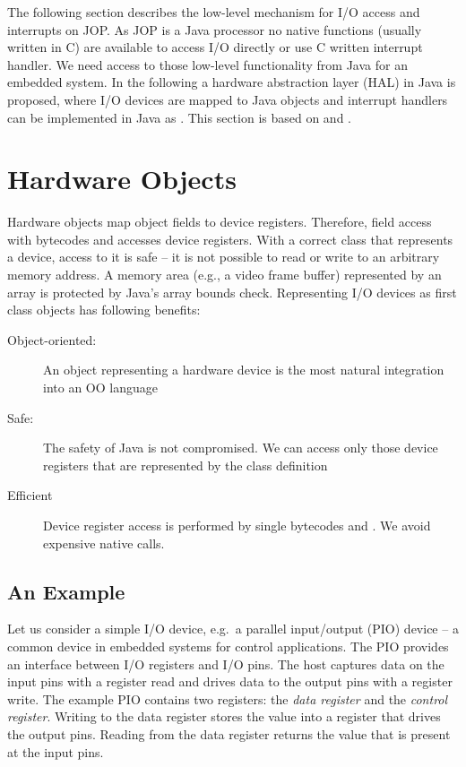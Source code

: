 
The following section describes the low-level mechanism for I/O
access and interrupts on JOP. As JOP is a Java processor no native
functions (usually written in C) are available to access I/O directly
or use C written interrupt handler. We need access to those low-level
functionality from Java for an embedded system. In the following a
hardware abstraction layer (HAL) in Java is proposed, where I/O
devices are mapped to Java objects and interrupt handlers can be
implemented in Java as . This section is based on
\cite{jop:hwobj} and \cite{jop:interrupt:handler}.


\section{Hardware Objects}
\label{sec:hwo} 

Hardware objects map object fields to device registers. Therefore,
field access with bytecodes  and 
accesses device registers. With a correct class that represents a
device, access to it is safe -- it is not possible to read or write
to an arbitrary memory address. A memory area (e.g., a video frame
buffer) represented by an array is protected by Java's array bounds
check. Representing I/O devices as first class objects has following
benefits:

\begin{description}
    \item[Object-oriented:] An object representing a hardware
        device is the most natural integration into an OO
        language
    \item[Safe:] The safety of Java is not compromised. We can
        access only those device registers that are represented
        by the class definition
    \item[Efficient] Device register access is performed by
        single bytecodes  and . We
        avoid expensive native calls.
\end{description}


\subsection{An Example}

Let us consider a simple I/O device, e.g.\ a parallel input/output
(PIO) device -- a common device in embedded systems for control
applications. The PIO provides an interface between I/O registers and
I/O pins. The host captures data on the input pins with a register
read and drives data to the output pins with a register write. The
example PIO contains two registers: the \emph{data register} and the
\emph{control register}. Writing to the data register stores the
value into a register that drives the output pins. Reading from the
data register returns the value that is present at the input pins.

